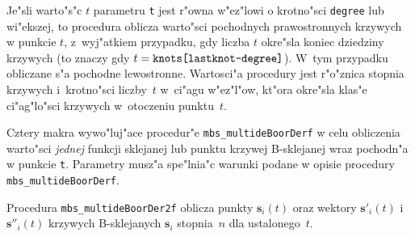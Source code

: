 \begin{sloppypar}
Je"sli warto"s"c $t$ parametru \texttt{t} jest r"owna w"ez"lowi o krotno"sci
\texttt{degree} lub wi"ekszej, to procedura oblicza warto"sci pochodnych
prawostronnych krzywych w punkcie $t$, z~wyj"atkiem przypadku, gdy liczba
$t$ okre"sla koniec dziedziny krzywych (to znaczy gdy
$t=\mbox{\texttt{knots[lastknot-degree]}}$). W~tym przypadku obliczane s"a
pochodne lewostronne. Wartosci"a procedury jest r"o"znica stopnia krzywych
i~krotno"sci liczby~$t$ w~ci"agu w"ez"l"ow, kt"ora okre"sla klas"e
ci"ag"lo"sci krzywych w~otoczeniu punktu~$t$.
\end{sloppypar}

\vspace{\bigskipamount}
\begin{sloppypar}
Cztery makra wywo"luj"ace procedur"e \texttt{mbs\_multideBoorDerf} w celu
obliczenia warto"sci \emph{jednej} funkcji sklejanej lub punktu krzywej
B-sklejanej wraz pochodn"a w punkcie \texttt{t}. Parametry musz"a spe"lnia"c
warunki podane w opisie procedury \texttt{mbs\_multideBoorDerf}.
\end{sloppypar}

\vspace{\bigskipamount}
\begin{sloppypar}
Procedura \texttt{mbs\_multideBoorDer2f} oblicza punkty $\bm{s}_i(t)$ oraz
wektory $\bm{s}'_i(t)$ i~$\bm{s}''_i(t)$ krzywych B-sklejanych $\bm{s}_i$
stopnia~$n$ dla ustalonego~$t$.
\end{sloppypar}

